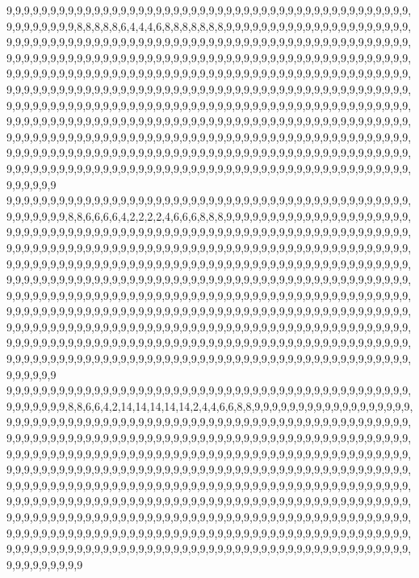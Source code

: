 9,9,9,9,9,9,9,9,9,9,9,9,9,9,9,9,9,9,9,9,9,9,9,9,9,9,9,9,9,9,9,9,9,9,9,9,9,9,9,9,9,9,9,9,9,9,9,9,9,9,9,9,9,9,8,8,8,8,8,6,4,4,4,6,8,8,8,8,8,8,8,9,9,9,9,9,9,9,9,9,9,9,9,9,9,9,9,9,9,9,9,9,9,9,9,9,9,9,9,9,9,9,9,9,9,9,9,9,9,9,9,9,9,9,9,9,9,9,9,9,9,9,9,9,9,9,9,9,9,9,9,9,9,9,9,9,9,9,9,9,9,9,9,9,9,9,9,9,9,9,9,9,9,9,9,9,9,9,9,9,9,9,9,9,9,9,9,9,9,9,9,9,9,9,9,9,9,9,9,9,9,9,9,9,9,9,9,9,9,9,9,9,9,9,9,9,9,9,9,9,9,9,9,9,9,9,9,9,9,9,9,9,9,9,9,9,9,9,9,9,9,9,9,9,9,9,9,9,9,9,9,9,9,9,9,9,9,9,9,9,9,9,9,9,9,9,9,9,9,9,9,9,9,9,9,9,9,9,9,9,9,9,9,9,9,9,9,9,9,9,9,9,9,9,9,9,9,9,9,9,9,9,9,9,9,9,9,9,9,9,9,9,9,9,9,9,9,9,9,9,9,9,9,9,9,9,9,9,9,9,9,9,9,9,9,9,9,9,9,9,9,9,9,9,9,9,9,9,9,9,9,9,9,9,9,9,9,9,9,9,9,9,9,9,9,9,9,9,9,9,9,9,9,9,9,9,9,9,9,9,9,9,9,9,9,9,9,9,9,9,9,9,9,9,9,9,9,9,9,9,9,9,9,9,9,9,9,9,9,9,9,9,9,9,9,9,9,9,9,9,9,9,9,9,9,9,9,9,9,9,9,9,9,9,9,9,9,9,9,9,9,9,9,9,9,9,9,9,9,9,9,9,9,9,9,9,9,9,9,9,9,9,9,9,9,9,9,9,9,9,9,9,9,9,9,9,9,9,9,9,9,9,9,9,9,9,9,9,9,9,9,9,9,9,9,9,9,9,9,9,9,9,9,9,9,9,9,9,9,9,9,9,9,9,9,9,9,9,9,9,9,9,9,9,9,9,9,9,9,9,9,9
9,9,9,9,9,9,9,9,9,9,9,9,9,9,9,9,9,9,9,9,9,9,9,9,9,9,9,9,9,9,9,9,9,9,9,9,9,9,9,9,9,9,9,9,9,9,9,9,9,9,9,9,9,8,8,6,6,6,6,4,2,2,2,2,4,6,6,6,8,8,8,9,9,9,9,9,9,9,9,9,9,9,9,9,9,9,9,9,9,9,9,9,9,9,9,9,9,9,9,9,9,9,9,9,9,9,9,9,9,9,9,9,9,9,9,9,9,9,9,9,9,9,9,9,9,9,9,9,9,9,9,9,9,9,9,9,9,9,9,9,9,9,9,9,9,9,9,9,9,9,9,9,9,9,9,9,9,9,9,9,9,9,9,9,9,9,9,9,9,9,9,9,9,9,9,9,9,9,9,9,9,9,9,9,9,9,9,9,9,9,9,9,9,9,9,9,9,9,9,9,9,9,9,9,9,9,9,9,9,9,9,9,9,9,9,9,9,9,9,9,9,9,9,9,9,9,9,9,9,9,9,9,9,9,9,9,9,9,9,9,9,9,9,9,9,9,9,9,9,9,9,9,9,9,9,9,9,9,9,9,9,9,9,9,9,9,9,9,9,9,9,9,9,9,9,9,9,9,9,9,9,9,9,9,9,9,9,9,9,9,9,9,9,9,9,9,9,9,9,9,9,9,9,9,9,9,9,9,9,9,9,9,9,9,9,9,9,9,9,9,9,9,9,9,9,9,9,9,9,9,9,9,9,9,9,9,9,9,9,9,9,9,9,9,9,9,9,9,9,9,9,9,9,9,9,9,9,9,9,9,9,9,9,9,9,9,9,9,9,9,9,9,9,9,9,9,9,9,9,9,9,9,9,9,9,9,9,9,9,9,9,9,9,9,9,9,9,9,9,9,9,9,9,9,9,9,9,9,9,9,9,9,9,9,9,9,9,9,9,9,9,9,9,9,9,9,9,9,9,9,9,9,9,9,9,9,9,9,9,9,9,9,9,9,9,9,9,9,9,9,9,9,9,9,9,9,9,9,9,9,9,9,9,9,9,9,9,9,9,9,9,9,9,9,9,9,9,9,9,9,9,9,9,9,9,9,9,9,9,9,9,9,9,9,9,9,9,9,9,9,9,9,9,9,9,9,9,9,9,9,9,9
9,9,9,9,9,9,9,9,9,9,9,9,9,9,9,9,9,9,9,9,9,9,9,9,9,9,9,9,9,9,9,9,9,9,9,9,9,9,9,9,9,9,9,9,9,9,9,9,9,9,9,9,9,8,8,6,6,4,2,14,14,14,14,14,2,4,4,6,6,8,8,9,9,9,9,9,9,9,9,9,9,9,9,9,9,9,9,9,9,9,9,9,9,9,9,9,9,9,9,9,9,9,9,9,9,9,9,9,9,9,9,9,9,9,9,9,9,9,9,9,9,9,9,9,9,9,9,9,9,9,9,9,9,9,9,9,9,9,9,9,9,9,9,9,9,9,9,9,9,9,9,9,9,9,9,9,9,9,9,9,9,9,9,9,9,9,9,9,9,9,9,9,9,9,9,9,9,9,9,9,9,9,9,9,9,9,9,9,9,9,9,9,9,9,9,9,9,9,9,9,9,9,9,9,9,9,9,9,9,9,9,9,9,9,9,9,9,9,9,9,9,9,9,9,9,9,9,9,9,9,9,9,9,9,9,9,9,9,9,9,9,9,9,9,9,9,9,9,9,9,9,9,9,9,9,9,9,9,9,9,9,9,9,9,9,9,9,9,9,9,9,9,9,9,9,9,9,9,9,9,9,9,9,9,9,9,9,9,9,9,9,9,9,9,9,9,9,9,9,9,9,9,9,9,9,9,9,9,9,9,9,9,9,9,9,9,9,9,9,9,9,9,9,9,9,9,9,9,9,9,9,9,9,9,9,9,9,9,9,9,9,9,9,9,9,9,9,9,9,9,9,9,9,9,9,9,9,9,9,9,9,9,9,9,9,9,9,9,9,9,9,9,9,9,9,9,9,9,9,9,9,9,9,9,9,9,9,9,9,9,9,9,9,9,9,9,9,9,9,9,9,9,9,9,9,9,9,9,9,9,9,9,9,9,9,9,9,9,9,9,9,9,9,9,9,9,9,9,9,9,9,9,9,9,9,9,9,9,9,9,9,9,9,9,9,9,9,9,9,9,9,9,9,9,9,9,9,9,9,9,9,9,9,9,9,9,9,9,9,9,9,9,9,9,9,9,9,9,9,9,9,9,9,9,9,9,9,9,9,9,9,9,9,9,9,9,9,9,9,9,9,9,9,9,9,9,9,9,9,9,9,9
